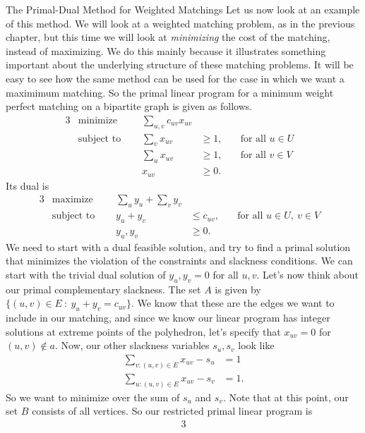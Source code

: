 \begin{section}{The Primal-Dual Method for Weighted Matchings}
	Let us now look at an example of this method. We will look at a weighted matching problem, as 
	in the previous chapter, but this time we will look at \emph{minimizing} the cost of the 
	matching, instead of maximizing. We do this mainly because it illustrates something important 
	about the underlying structure of these matching problems. It will be easy to see how the 
	same method can be used for the case in which we want a maximimum matching. So the primal 
	linear program for a minimum weight perfect matching on a bipartite graph is given as follows. 
	\begin{alignat}{3}
		& \text{minimize } & \sum_{u,v} c_{uv} x_{uv}& \\
		& \text{subject to } \quad & \sum_{v} x_{uv} & \geq 1, & \quad \text{for all } u\in U& \\
				     &\quad & \sum_{u} x_{uv} & \geq 1, & \quad \text{for all } v\in 
				     V & \\
				&& x_{uv} & \geq 0.
	\end{alignat}
	Its dual is
	\begin{alignat}{3}
		& \text{maximize } & \sum_{u}y_u + \sum_{v}y_v & \\
		& \text{subject to } \quad & y_u + y_v & \leq c_{uv}, & \quad \text{for all }
					u\in U,\ v\in V & \\
				    && y_u,y_v & \geq 0.
	\end{alignat}
	We need to start with a dual feasible solution, and try to find a primal solution that 
	minimizes the violation of the constraints and slackness conditions. We can start with the 
	trivial dual solution of $y_u,y_v = 0$ for all $u,v$. Let's now think about our primal 
	complementary slackness. The set $A$ is given by $\{(u,v)\in E\ :\ y_u + y_v = c_{uv}\}$. 
	We know that these are the edges we want to include in our matching, and since we know our 
	linear program has integer solutions at extreme points of the polyhedron, let's specify that 
	$x_{uv} = 0$ for $(u,v)\notin a$. Now, our other slackness variables $s_u,s_v$ look like 
	\begin{align*}
		\sum_{v:(u,v)\in E} x_{uv} - s_u &= 1 \\
		\sum_{u:(u,v)\in E} x_{uv} - s_v &= 1.
	\end{align*}
	So we want to minimize over the sum of $s_u$ and $s_v$. Note that at this point, our set $B$ 
	consists of all vertices. So our restricted primal linear program is
	\begin{alignat}{3}

\end{alignat}
\end{section}
